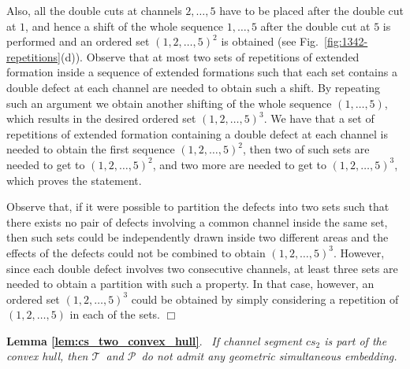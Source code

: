 \documentclass[a4paper,10pt]{llncs}
\newcounter{prop}
\renewenvironment{proof}
{{\bf Proof:}}{\hspace*{\fill}$\Box$\par\vspace{2mm}}
\newcommand{\rephrase}[3]{\noindent\textbf{#1 #2}.~\emph{#3}}
\newcommand{\T}{\mbox{$\mathcal T$ }}
\renewcommand{\P}{\mbox{$\mathcal P$ }}
\begin{document}
\begin{proof}
Also, all the double cuts at channels $2,\dots,5$ have to be placed after the double cut at $1$, and hence a shift of the whole sequence $1,\dots,5$ after the double cut at $5$ is performed and an ordered set $(1,2,\ldots ,5)^2$ is obtained (see Fig.~\ref{fig:1342-repetitions}(d)). Observe that at most two sets of repetitions of extended formation inside a sequence of extended formations such that each set contains a double defect at each channel are needed to obtain such a shift. By repeating such an argument we obtain another shifting of the whole sequence $(1,\dots,5)$, which results in the desired ordered set $(1,2,\ldots ,5)^3$. We have that a set of repetitions of extended formation containing a double defect at each channel is needed to obtain the first sequence $(1,2,\ldots ,5)^2$, then two of such sets are needed to get to $(1,2,\ldots ,5)^2$, and two more are needed to get to $(1,2,\ldots ,5)^3$, which proves the statement.

Observe that, if it were possible to partition the defects into two sets such that there exists no pair of defects involving a common channel inside the same set, then such sets could be independently drawn inside two different areas and the effects of the defects could not be combined to obtain $(1,2,\ldots ,5)^3$. However, since each double defect involves two consecutive channels, at least three sets are needed to obtain a partition with such a property. In that case, however, an ordered set $(1,2,\ldots ,5)^3$ could be obtained by simply considering a repetition of $(1,2,\ldots ,5)$ in each of the sets.
\end{proof}

\rephrase{Lemma}{\ref{lem:cs_two_convex_hull}}{
If channel segment $cs_2$ is part of the convex hull, then \T and \P do not admit any geometric simultaneous embedding.
}
\end{document}
